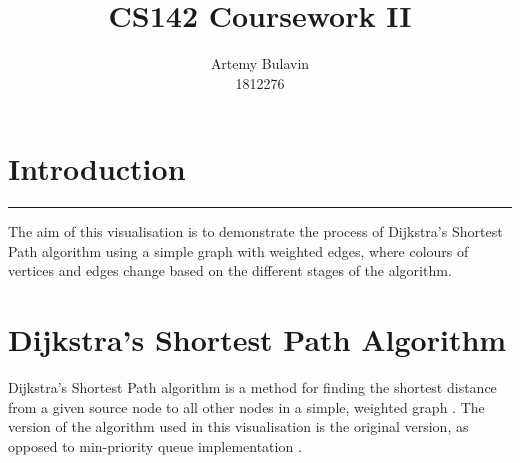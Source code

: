 \documentclass[11pt,a4paper]{article}
\title{\textbf{CS142 Coursework II}}
\author{Artemy Bulavin \\ 1812276}
\date{}
\begin{document}
\maketitle


\section*{Introduction}
\hrule
\vspace{11pt}
The aim of this visualisation is to demonstrate the process of Dijkstra's Shortest Path algorithm using 
a simple graph with weighted edges, where colours of vertices and edges change based on the different stages
of the algorithm.

\section*{Dijkstra's Shortest Path Algorithm}

Dijkstra's Shortest Path algorithm is a method for finding the shortest distance from a given
source node to all other nodes in a simple, weighted graph \cite{djikstra1959note}. The version of the algorithm
used in this visualisation is the original version, as opposed to min-priority queue implementation
\cite{fredman1987fibonacci}.



\end{document}
